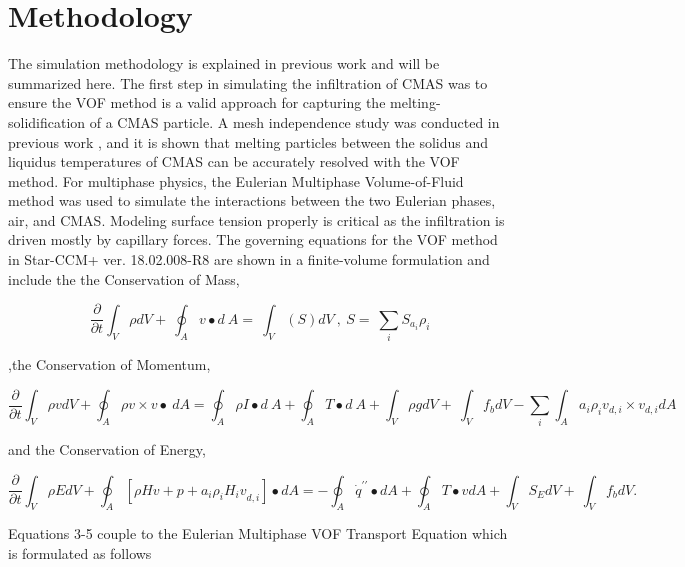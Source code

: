 \documentclass[conf]{new-aiaa}
\begin{document}
\section{Methodology}

The simulation methodology is explained in previous work \cite{Cavainolo2023, Cavainolo2022} and will be summarized here. The first step in simulating the infiltration of CMAS was to ensure the VOF method is a valid approach for capturing the melting-solidification of a CMAS particle. A mesh independence study was conducted in previous work \cite{Cavainolo2022}, and it is shown that melting particles between the solidus and liquidus temperatures of CMAS can be accurately resolved with the VOF method. For multiphase physics, the Eulerian Multiphase Volume-of-Fluid method was used to simulate the interactions between the two Eulerian phases, air, and CMAS.  Modeling surface tension properly is critical as the infiltration is driven mostly by capillary forces. The governing equations for the VOF method in Star-CCM+ ver. 18.02.008-R8 \cite{starccm} are shown in a finite-volume formulation and include the the Conservation of Mass,

\begin{equation}
\label{consMass:equation}
    \frac{\partial}{\partial t}\int_{V}\rho dV+\ \oint_{A}{v\bullet d\ A}=\ \int_{V}\left(S\right)dV\ ,\ S=\ \sum_{i}{S_{a_i}\rho_i}
\end{equation}

\noindent,the Conservation of Momentum,

\begin{equation}
\label{consMomentum:equation}
    \frac{\partial}{\partial t}\int_{V}\rho vdV+\oint_{A}{\rho v\times v}\bullet\ dA=\oint_{A}{\rho I\bullet d\ A}+\oint_{A}{T\bullet d\ A}+\int_{V}\rho gdV+\ \int_{V}{f_bdV}-\sum_{i}\int_{A}{a_i\rho_iv_{d,i}\times v_{d,i}dA}
\end{equation}

\noindent and the Conservation of Energy,

\begin{equation}
\label{consEnergy:equation}
   \frac{\partial}{\partial t}\int_{V}\rho EdV+\oint_{A}\left[\rho Hv+p+a_i\rho_i{H_iv}_{d,i}\right]\bullet dA=-\oint_{A}{{\dot{q}}^{\prime\prime}\bullet d A}+\oint_{A}{T\bullet v d A}+\int_{V}{S_EdV}+\ \int_{V}{f_bdV}.
\end{equation}

\noindent Equations 3-5 couple to the Eulerian Multiphase VOF Transport Equation which is formulated as follows 
\end{document}
